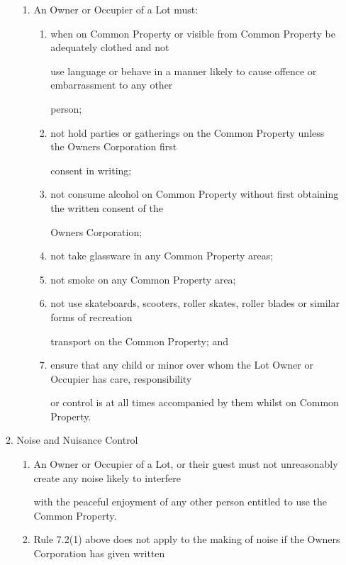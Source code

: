 \documentclass{article}
\begin{document}
\begin{enumerate}[label=\arabic*.]
\begin{enumerate}[label=\arabic{enumi}.\arabic*.]
\begin{enumerate}[label=(\arabic*)]
\item  An Owner or Occupier of a Lot must: 

\begin{enumerate}[label=(\alph*)]
\item  when on Common Property or visible from Common Property be adequately clothed and not 

use language or behave in a manner likely to cause offence or embarrassment to any other 

person; 

\newpage

\item  not hold parties or gatherings on the Common Property unless the Owners Corporation first 

consent in writing; 

\item  not consume alcohol on Common Property without first obtaining the written consent of the 

Owners Corporation; 

\item  not take glassware in any Common Property areas; 

\item  not smoke on any Common Property area; 

\item  not use skateboards, scooters, roller skates, roller blades or similar forms of recreation 

transport on the Common Property; and 

\item  ensure that any child or minor over whom the Lot Owner or Occupier has care, responsibility 

or control is at all times accompanied by them whilst on Common Property. 

\end{enumerate}
\end{enumerate}
\item  Noise and Nuisance Control 

\begin{enumerate}[label=(\arabic*)]
\item  An Owner or Occupier of a Lot, or their guest must not unreasonably create any noise likely to interfere 

with the peaceful enjoyment of any other person entitled to use the Common Property. 

\item  Rule 7.2(1) above does not apply to the making of noise if the Owners Corporation has given written 


\end{enumerate}
\end{enumerate}
\end{enumerate}
\end{document}
